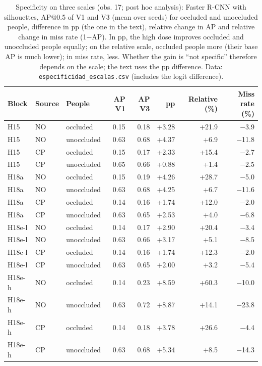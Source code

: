 \begin{table}[H]\centering\footnotesize
\caption{Specificity on three scales (obs. 17; post hoc analysis): Faster R-CNN with silhouettes, AP@0.5 of V1 and V3 (mean over seeds) for occluded and unoccluded people, difference in pp (the one in the text), relative change in AP and relative change in miss rate (1$-$AP). In pp, the high dose improves occluded and unoccluded people equally; on the relative scale, occluded people more (their base AP is much lower); in miss rate, less. Whether the gain is ``not specific'' therefore depends on the scale; the text uses the pp difference. Data: \texttt{especificidad\_escalas.csv} (includes the logit difference).}\label{tab:s-escalas}
\begin{tabular}{@{}lllrrrrr@{}}\toprule
Block & Source & People & AP V1 & AP V3 & pp & Relative (\%) & Miss rate (\%) \\\midrule
H15 & NO & occluded & 0.15 & 0.18 & +3.28 & +21.9 & $-$3.9 \\
H15 & NO & unoccluded & 0.63 & 0.68 & +4.37 & +6.9 & $-$11.8 \\
H15 & CP & occluded & 0.15 & 0.17 & +2.33 & +15.4 & $-$2.7 \\
H15 & CP & unoccluded & 0.65 & 0.66 & +0.88 & +1.4 & $-$2.5 \\
H18a & NO & occluded & 0.15 & 0.19 & +4.26 & +28.7 & $-$5.0 \\
H18a & NO & unoccluded & 0.63 & 0.68 & +4.25 & +6.7 & $-$11.6 \\
H18a & CP & occluded & 0.14 & 0.16 & +1.74 & +12.0 & $-$2.0 \\
H18a & CP & unoccluded & 0.63 & 0.65 & +2.53 & +4.0 & $-$6.8 \\
H18e-l & NO & occluded & 0.14 & 0.17 & +2.90 & +20.4 & $-$3.4 \\
H18e-l & NO & unoccluded & 0.63 & 0.66 & +3.17 & +5.1 & $-$8.5 \\
H18e-l & CP & occluded & 0.14 & 0.16 & +1.74 & +12.3 & $-$2.0 \\
H18e-l & CP & unoccluded & 0.63 & 0.65 & +2.00 & +3.2 & $-$5.4 \\
H18e-h & NO & occluded & 0.14 & 0.23 & +8.59 & +60.3 & $-$10.0 \\
H18e-h & NO & unoccluded & 0.63 & 0.72 & +8.87 & +14.1 & $-$23.8 \\
H18e-h & CP & occluded & 0.14 & 0.18 & +3.78 & +26.6 & $-$4.4 \\
H18e-h & CP & unoccluded & 0.63 & 0.68 & +5.34 & +8.5 & $-$14.3 \\
\bottomrule\end{tabular}\end{table}
